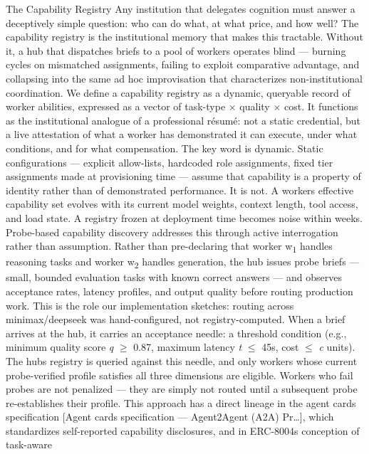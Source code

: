 \documentclass[
]{article}
\begin{document}
The Capability Registry Any institution that delegates cognition must
answer a deceptively simple question: who can do what, at what price,
and how well? The capability registry is the institutional memory that
makes this tractable. Without it, a hub that dispatches briefs to a pool
of workers operates blind --- burning cycles on mismatched assignments,
failing to exploit comparative advantage, and collapsing into the same
ad hoc improvisation that characterizes non-institutional coordination.
We define a capability registry as a dynamic, queryable record of worker
abilities, expressed as a vector of task-type $\times$ quality $\times$ cost. It
functions as the institutional analogue of a professional résumé: not a
static credential, but a live attestation of what a worker has
demonstrated it can execute, under what conditions, and for what
compensation. The key word is dynamic. Static configurations ---
explicit allow-lists, hardcoded role assignments, fixed tier assignments
made at provisioning time --- assume that capability is a property of
identity rather than of demonstrated performance. It is not. A
worker\textquotesingle s effective capability set evolves with its
current model weights, context length, tool access, and load state. A
registry frozen at deployment time becomes noise within weeks.
Probe-based capability discovery addresses this through active
interrogation rather than assumption. Rather than pre-declaring that
worker w\textsubscript{1} handles reasoning tasks and worker w\textsubscript{2} handles generation, the
hub issues probe briefs --- small, bounded evaluation tasks with known
correct answers --- and observes acceptance rates, latency profiles, and
output quality before routing production work. This is the role our
implementation sketches: routing across minimax/deepseek was
hand-configured, not registry-computed. When a brief arrives at the hub,
it carries an acceptance needle: a threshold condition (e.g., minimum
quality score \emph{q} $\geq$ 0.87, maximum latency \emph{t} $\leq$ 45s, cost $\leq$
\emph{c} units). The hub\textquotesingle s registry is queried against
this needle, and only workers whose current probe-verified profile
satisfies all three dimensions are eligible. Workers who fail probes are
not penalized --- they are simply not routed until a subsequent probe
re-establishes their profile. This approach has a direct lineage in the
agent cards specification {[}Agent cards specification --- Agent2Agent
(A2A) Pr\ldots{]}, which standardizes self-reported capability
disclosures, and in ERC-8004\textquotesingle s conception of task-aware
\end{document}
